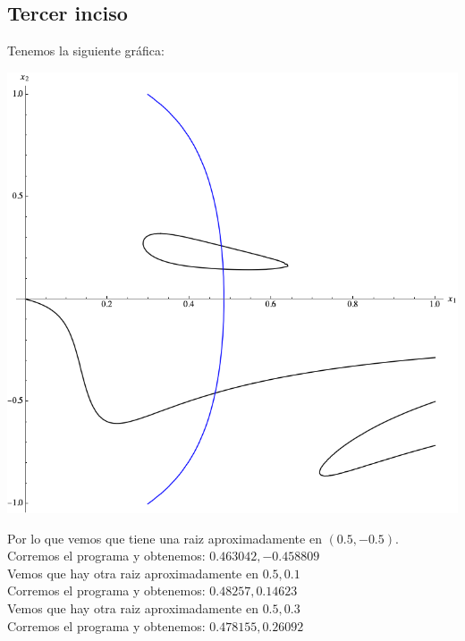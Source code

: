 \documentclass{article}
\begin{document}
\subsection{Tercer inciso}
Tenemos la siguiente gráfica:
\begin{center}
    \includegraphics[scale=0.5]{grafica3.png}    
\end{center}
Por lo que vemos que tiene una raiz aproximadamente en $(0.5, -0.5)$.\\
Corremos el programa y obtenemos: ${0.463042,-0.458809}$\\
Vemos que hay otra raiz aproximadamente en ${0.5,0.1}$\\
Corremos el programa y obtenemos: ${0.48257,0.14623}$\\
Vemos que hay otra raiz aproximadamente en ${0.5,0.3}$\\
Corremos el programa y obtenemos: ${0.478155,0.26092}$\\
\end{document}
